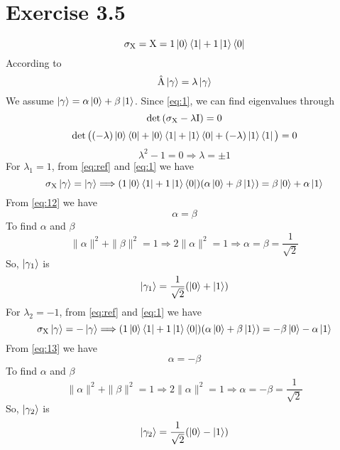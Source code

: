 \documentclass[12pt]{article}
\begin{document}
\section*{Exercise 3.5}
\begin{equation}
    \label{eq:1}
    \sigma_{\textnormal{X}} = \textnormal{X} = 1\ket{0}\bra{1} + 1\ket{1}\bra{0}
\end{equation}
According to
\begin{equation}
    \label{eq:ref}
    \hat{\textnormal{A}}\ket{\gamma} = \lambda\ket{\gamma}
\end{equation}
We assume $\ket{\gamma} = \alpha\ket{0}+\beta\ket{1}$.
Since \ref{eq:1}, we can find eigenvalues through
\begin{equation}
\det{(\sigma_{\textnormal{X}} - \lambda\textnormal{I})} = 0
\end{equation}
\begin{equation*}
\det{\big((-\lambda)\ket{0}\bra{0} + \ket{0}\bra{1} + \ket{1}\bra{0} + (-\lambda)\ket{1}\bra{1}\big)} = 0
\end{equation*}
\begin{equation*}
    \lambda^2 - 1 = 0 \Longrightarrow \lambda = \pm 1
\end{equation*}
For $\lambda_1 = 1$, from \ref{eq:ref} and \ref{eq:1} we have
\begin{equation}
    \label{eq:12}
    \sigma_{\textnormal{X}}\ket{\gamma} = \ket{\gamma} \Longrightarrow (1\ket{0}\bra{1} + 1\ket{1}\bra{0})(\alpha\ket{0}+\beta\ket{1}) = \beta\ket{0}+\alpha\ket{1} 
\end{equation}
From \ref{eq:12} we have
\begin{equation}
    \alpha = \beta
\end{equation}
To find $\alpha$ and $\beta$
\begin{equation}
    \|\alpha\|^2 + \|\beta\|^2 = 1 \Longrightarrow 2\|\alpha\|^2 = 1 \Longrightarrow \alpha = \beta = \frac{1}{\sqrt{2}}
\end{equation}
So, $\ket{\gamma_{1}}$ is
\begin{equation}
    \ket{\gamma_{1}} = \frac{1}{\sqrt{2}}(\ket{0} + \ket{1})
\end{equation}
For $\lambda_2 = -1$, from \ref{eq:ref} and \ref{eq:1} we have
\begin{equation}
    \label{eq:13}
    \sigma_{\textnormal{X}}\ket{\gamma} = -\ket{\gamma} \Longrightarrow (1\ket{0}\bra{1} + 1\ket{1}\bra{0})(\alpha\ket{0}+\beta\ket{1}) = -\beta\ket{0}-\alpha\ket{1} 
\end{equation}
From \ref{eq:13} we have
\begin{equation}
    \alpha = -\beta
\end{equation}
To find $\alpha$ and $\beta$
\begin{equation}
    \|\alpha\|^2 + \|\beta\|^2 = 1 \Longrightarrow 2\|\alpha\|^2 = 1 \Longrightarrow \alpha = - \beta = \frac{1}{\sqrt{2}}
\end{equation}
So, $\ket{\gamma_{2}}$ is
\begin{equation}
    \ket{\gamma_{2}} = \frac{1}{\sqrt{2}}(\ket{0} - \ket{1})
\end{equation}
\end{document}
